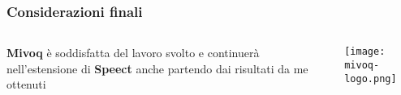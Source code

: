 \begin{frame}
  \frametitle{Considerazioni finali}
  \begin{columns}
    \begin{column}{0.4\textwidth}
      \textbf{Mivoq} è soddisfatta del lavoro svolto e continuerà 
              nell'estensione di \textbf{Speect} anche partendo dai risultati da me ottenuti
    \end{column}
    \begin{column}{0.6\textwidth}
      \texttt{[image: mivoq-logo.png]}
    \end{column}	
  \end{columns}
\end{frame}
